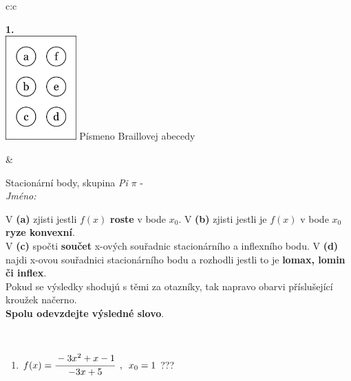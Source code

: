\documentclass[10pt]{report}
\begin{document}
\begin{tabular}{c:c}
\begin{minipage}[c][104.5mm][t]{0.5\linewidth}
\begin{center}
\begin{minipage}{0.79\linewidth}
\end{minipage}
\begin{minipage}{0.20\linewidth}
\begin{center}
{\Huge\bfseries 1.} \\[2mm]
\includegraphics[height=40mm]{../images/braille.png}
{\small Písmeno Braillovej abecedy}
\end{center}
\end{minipage}
\end{center}
\end{minipage}
&
\begin{minipage}[c][104.5mm][t]{0.5\linewidth}
\begin{center}
\vspace{7mm}
{\huge Stacionární body, skupina \textit{Pi $\pi$} -}\\[5mm]
\textit{Jméno:}\phantom{xxxxxxxxxxxxxxxxxxxxxxxxxxxxxxxxxxxxxxxxxxxxxxxxxxxxxxxxxxxxxxxxx}\\[5mm]
\begin{minipage}{0.95\linewidth}
\begin{center}
{\small V \textbf{(a)} zjisti jestli $f(x)$ \textbf{roste} v bode $x_0$. V \textbf{(b)} zjisti jestli je $f(x)$ v bode $x_0$ \textbf{ryze konvexní}.\\V \textbf{(c)} spočti \textbf{součet} x-ových souřadnic stacionárního a inflexního bodu. V \textbf{(d)} najdi x-ovou souřadnici stacionárního bodu a rozhodli jestli to je \textbf{lomax, lomin či inflex}.\\Pokud se výsledky shodujú s těmi za otazníky, tak napravo obarvi příslušející kroužek načerno.\\\textbf{Spolu odevzdejte výsledné slovo}}.
\end{center}
\end{minipage}
\\[1mm]
\begin{minipage}{0.79\linewidth}
\begin{center}
\begin{varwidth}{\linewidth}
\begin{enumerate}
\normalsize
\item $f(x)=\cfrac{-3x^2+x-1}{-3x+5}\enspace , \enspace x_0=1$\quad \dotfill\; ???\;\dotfill \quad {}

\end{enumerate}
\end{varwidth}
\end{center}
\end{minipage}
\end{center}
\end{minipage}
\end{tabular}
\end{document}
